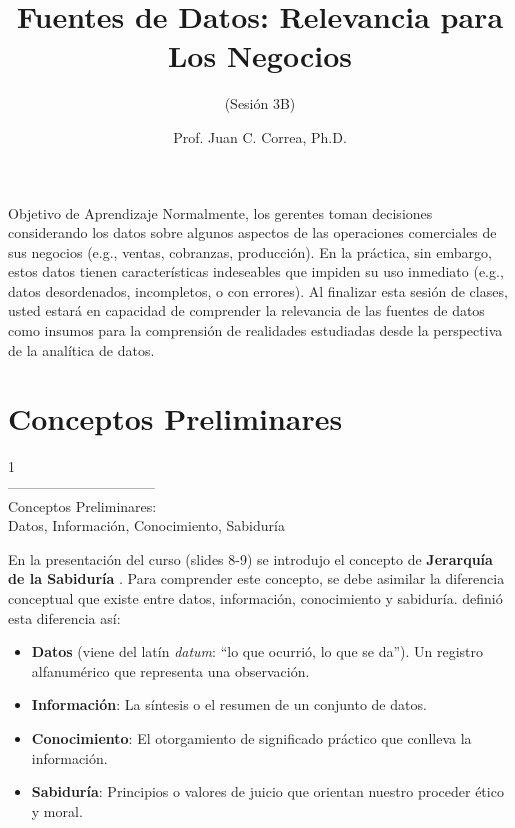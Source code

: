 \documentclass[aspectratio=169]{beamer}
\title[Fuentes de Datos: Relevancia para Los Negocios]{Fuentes de Datos: Relevancia para Los Negocios}
\subtitle{(Sesión 3B)}
\author[Prof. Juan C. Correa, Ph.D.]{Prof. Juan C. Correa, Ph.D.}
\institute[]{
Colegio de Estudios Superiores de Administración\\
Bogotá - Colombia\\
}
\date[Bogotá, Agosto, 2021] %
{}
\begin{document}
\begin{frame}
\titlepage
\end{frame}


\begin{frame}
\begin{block}{Objetivo de Aprendizaje}
Normalmente, los gerentes toman decisiones considerando los datos sobre algunos aspectos de las operaciones comerciales de sus negocios (e.g., ventas, cobranzas, producción). En la práctica, sin embargo, estos datos tienen características indeseables que impiden su uso inmediato (e.g., datos desordenados, incompletos, o con errores). Al finalizar esta sesión de clases, usted estará en capacidad de comprender la relevancia de las fuentes de datos como insumos para la comprensión de realidades estudiadas desde la perspectiva de la analítica de datos.
\end{block}
\end{frame}


\section{Conceptos Preliminares}
\begin{frame}
\begin{center}
\Huge
\textcolor{azulcesaclaro}{1\\
--------------------------------\\
Conceptos Preliminares:\\
Datos, Información, Conocimiento, Sabiduría}
\end{center}
\end{frame}

\begin{frame}
En la presentación del curso (slides 8-9) se introdujo el concepto de \textbf{Jerarquía de la Sabiduría} \cite{Rowley2007}. Para comprender este concepto, se debe asimilar la diferencia conceptual que existe entre datos, información, conocimiento y sabiduría. \citeauthor{Zins2007} \citeyear{Zins2007} definió esta diferencia así:\\
\vspace{0.3cm}
\begin{itemize}
\item \textbf{Datos} (viene del latín \textit{datum}: ``lo que ocurrió, lo que se da''). Un registro alfanumérico que representa una observación.
\item \textbf{Información}: La síntesis o el resumen de un conjunto de datos.
\item \textbf{Conocimiento}: El otorgamiento de significado práctico que conlleva la información.
\item \textbf{Sabiduría}: Principios o valores de juicio que orientan nuestro proceder ético y moral. 
\end{itemize}
\end{frame}
\end{document}
